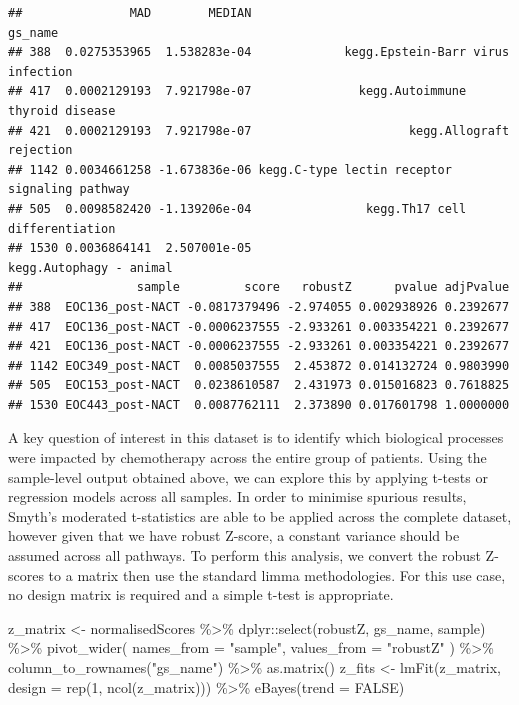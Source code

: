 \documentclass[9pt,a4paper,]{extarticle}
\newenvironment{Shaded}{\begin{snugshade}}{\end{snugshade}}
\newcommand{\AttributeTok}[1]{\textcolor[rgb]{0.77,0.63,0.00}{#1}}
\newcommand{\ConstantTok}[1]{\textcolor[rgb]{0.00,0.00,0.00}{#1}}
\newcommand{\DecValTok}[1]{\textcolor[rgb]{0.00,0.00,0.81}{#1}}
\newcommand{\FunctionTok}[1]{\textcolor[rgb]{0.00,0.00,0.00}{#1}}
\newcommand{\NormalTok}[1]{#1}
\newcommand{\OtherTok}[1]{\textcolor[rgb]{0.56,0.35,0.01}{#1}}
\newcommand{\SpecialCharTok}[1]{\textcolor[rgb]{0.00,0.00,0.00}{#1}}
\newcommand{\StringTok}[1]{\textcolor[rgb]{0.31,0.60,0.02}{#1}}
\begin{document}
\begin{verbatim}
##               MAD        MEDIAN                                       gs_name
## 388  0.0275353965  1.538283e-04             kegg.Epstein-Barr virus infection
## 417  0.0002129193  7.921798e-07               kegg.Autoimmune thyroid disease
## 421  0.0002129193  7.921798e-07                      kegg.Allograft rejection
## 1142 0.0034661258 -1.673836e-06 kegg.C-type lectin receptor signaling pathway
## 505  0.0098582420 -1.139206e-04                kegg.Th17 cell differentiation
## 1530 0.0036864141  2.507001e-05                       kegg.Autophagy - animal
##                sample         score   robustZ      pvalue adjPvalue
## 388  EOC136_post-NACT -0.0817379496 -2.974055 0.002938926 0.2392677
## 417  EOC136_post-NACT -0.0006237555 -2.933261 0.003354221 0.2392677
## 421  EOC136_post-NACT -0.0006237555 -2.933261 0.003354221 0.2392677
## 1142 EOC349_post-NACT  0.0085037555  2.453872 0.014132724 0.9803990
## 505  EOC153_post-NACT  0.0238610587  2.431973 0.015016823 0.7618825
## 1530 EOC443_post-NACT  0.0087762111  2.373890 0.017601798 1.0000000
\end{verbatim}

A key question of interest in this dataset is to identify which biological processes were impacted by chemotherapy across the entire group of patients.
Using the sample-level output obtained above, we can explore this by applying t-tests or regression models across all samples.
In order to minimise spurious results, Smyth's moderated t-statistics\citep{Smyth_2004} are able to be applied across the complete dataset, however given that we have robust Z-score, a constant variance should be assumed across all pathways.
To perform this analysis, we convert the robust Z-scores to a matrix then use the standard limma methodologies.
For this use case, no design matrix is required and a simple t-test is appropriate.

\begin{Shaded}
\begin{Highlighting}[]
\NormalTok{z\_matrix }\OtherTok{\textless{}{-}}\NormalTok{ normalisedScores }\SpecialCharTok{\%\textgreater{}\%}
\NormalTok{  dplyr}\SpecialCharTok{::}\FunctionTok{select}\NormalTok{(robustZ, gs\_name, sample) }\SpecialCharTok{\%\textgreater{}\%}
  \FunctionTok{pivot\_wider}\NormalTok{(}
    \AttributeTok{names\_from =} \StringTok{"sample"}\NormalTok{, }\AttributeTok{values\_from =} \StringTok{"robustZ"}
\NormalTok{  ) }\SpecialCharTok{\%\textgreater{}\%}
  \FunctionTok{column\_to\_rownames}\NormalTok{(}\StringTok{"gs\_name"}\NormalTok{) }\SpecialCharTok{\%\textgreater{}\%}
  \FunctionTok{as.matrix}\NormalTok{()}
\NormalTok{z\_fits }\OtherTok{\textless{}{-}} \FunctionTok{lmFit}\NormalTok{(z\_matrix, }\AttributeTok{design =} \FunctionTok{rep}\NormalTok{(}\DecValTok{1}\NormalTok{, }\FunctionTok{ncol}\NormalTok{(z\_matrix))) }\SpecialCharTok{\%\textgreater{}\%} 
  \FunctionTok{eBayes}\NormalTok{(}\AttributeTok{trend =} \ConstantTok{FALSE}\NormalTok{)}
\end{Highlighting}
\end{Shaded}
\end{document}
